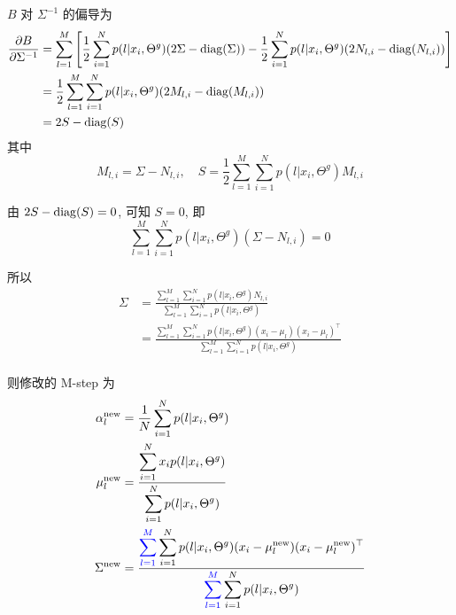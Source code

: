 \documentclass{article}
\begin{document}
$B$ 对 $\Sigma^{-1}$ 的偏导为
\begin{equation}
  \begin{aligned}
    \frac{\partial B}{\partial\Sigma^{-1}}
    &=\sum_{l=1}^M\left[\frac{1}{2}\sum_{i=1}^Np(l|x_i,\Theta^g)(2\Sigma-\operatorname{diag}(\Sigma))-\frac{1}{2}\sum_{i=1}^Np(l|x_i,\Theta^g)(2N_{l,i}-\operatorname{diag}(N_{l,i}))\right]\\
    &=\frac{1}{2}\sum_{l=1}^M\sum_{i=1}^Np(l|x_i,\Theta^g)(2M_{l,i}-\operatorname{diag}(M_{l,i}))\\
    &=2S-\operatorname{diag}(S)
  \end{aligned}
\end{equation}
其中 
\begin{equation}
  M_{l,i}=\Sigma-N_{l,i},\quad S=\frac{1}{2}\sum_{l=1}^M\sum_{i=1}^Np(l|x_i,\Theta^g)M_{l,i}
\end{equation}

由 $2S-\operatorname{diag}(S)=0$, 可知 $S=0$, 即
\begin{equation}
  \sum_{l=1}^M\sum_{i=1}^Np(l|x_i,\Theta^g)(\Sigma-N_{l,i})=0
\end{equation}

所以
\begin{equation}
  \begin{aligned}
    \Sigma
    &=\frac{\displaystyle\sum_{l=1}^M\sum_{i=1}^Np(l|x_i,\Theta^g)N_{l,i}}{\displaystyle\sum_{l=1}^M\sum_{i=1}^Np(l|x_i,\Theta^g)}\\
    &=\frac{\displaystyle\sum_{l=1}^M\sum_{i=1}^Np(l|x_i,\Theta^g)(x_i-\mu_l)(x_i-\mu_l)^{\top}}{\displaystyle\sum_{l=1}^M\sum_{i=1}^Np(l|x_i,\Theta^g)}\\
  \end{aligned}
\end{equation}

则修改的 M-step 为
\begin{equation}
  \begin{aligned}
    \alpha_l^{\mathrm{new}}&=\frac{1}{N}\sum_{i=1}^Np(l|x_i,\Theta^g)\\
    \mu_l^{\mathrm{new}}&=\frac{\displaystyle\sum_{i=1}^Nx_ip(l|x_i,\Theta^g)}{\displaystyle\sum_{i=1}^Np(l|x_i,\Theta^g)}\\
    \Sigma^{\mathrm{new}}&=\frac{\displaystyle{\color{blue}\sum_{l=1}^M}\sum_{i=1}^Np(l|x_i,\Theta^g)(x_i-\mu_l^{\mathrm{new}})(x_i-\mu_l^{\mathrm{new}})^{\top}}{\displaystyle{\color{blue}\sum_{l=1}^M}\sum_{i=1}^Np(l|x_i,\Theta^g)}\\
  \end{aligned}
\end{equation}
\end{document}
